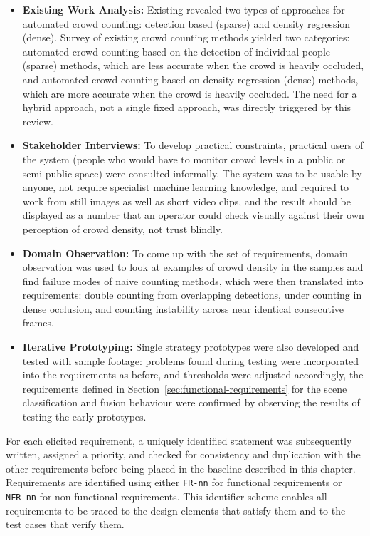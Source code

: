 \begin{itemize}

    \item \textbf{Existing Work Analysis:} Existing revealed two types of approaches for automated crowd counting: detection based (sparse) and density regression (dense). Survey of existing crowd counting methods yielded two categories: automated crowd counting based on the detection of individual people (sparse) methods, which are less accurate when the crowd is heavily occluded, and automated crowd counting based on density regression (dense) methods, which are more accurate when the crowd is heavily occluded. The need for a hybrid approach, not a single fixed approach, was directly triggered by this review.

    \item \textbf{Stakeholder Interviews:} To develop practical constraints, practical users of the system (people who would have to monitor crowd levels in a public or semi public space) were consulted informally. The system was to be usable by anyone, not require specialist machine learning knowledge, and required to work from still images as well as short video clips, and the result should be displayed as a number that an operator could check visually against their own perception of crowd density, not trust blindly.

    \item \textbf{Domain Observation:} To come up with the set of requirements, domain observation was used to look at examples of crowd density in the samples and find failure modes of naive counting methods, which were then translated into requirements: double counting from overlapping detections, under counting in dense occlusion, and counting instability across near identical consecutive frames.

    \item \textbf{Iterative Prototyping:} Single strategy prototypes were also developed and tested with sample footage: problems found during testing were incorporated into the requirements as before, and thresholds were adjusted accordingly, the requirements defined in Section~\ref{sec:functional-requirements} for the scene classification and fusion behaviour were confirmed by observing the results of testing the early prototypes. 
    
\end{itemize}

For each elicited requirement, a uniquely identified statement was subsequently written, assigned a priority, and checked for consistency and duplication with the other requirements before being placed in the baseline described in this chapter. Requirements are identified using either \texttt{FR-nn} for functional requirements or \texttt{NFR-nn} for non-functional requirements. This identifier scheme enables all requirements to be traced to the design elements that satisfy them and to the test cases that verify them.

